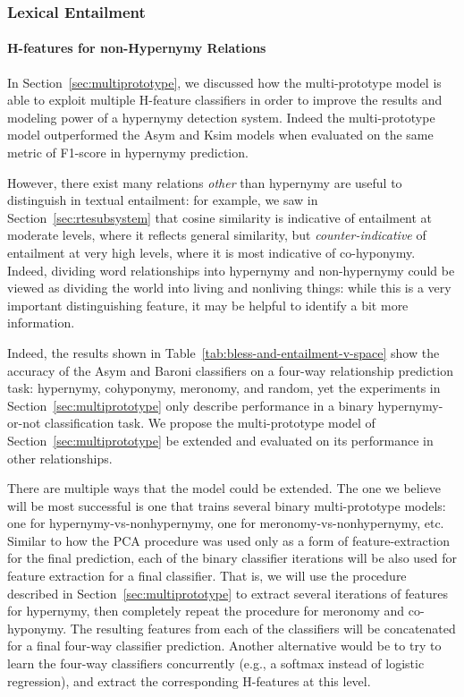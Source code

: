 \documentclass[letterpaper]{article}
\begin{document}
\subsubsection{Lexical Entailment}

\paragraph{H-features for non-Hypernymy Relations}

In Section~\ref{sec:multiprototype}, we discussed how the multi-prototype model
is able to exploit multiple H-feature classifiers in order to improve the results
and modeling power of a hypernymy detection system. Indeed the multi-prototype
model outperformed the Asym and Ksim models when evaluated on the same metric of
F1-score in hypernymy prediction.

However, there exist many relations {\em other} than hypernymy are useful to
distinguish in textual entailment: for example, we saw in
Section~\ref{sec:rtesubsystem} that cosine similarity is indicative of entailment
at moderate levels, where it reflects general similarity, but {\em counter-indicative}
of entailment at very high levels, where it is most indicative of co-hyponymy.
Indeed, dividing word relationships into hypernymy and non-hypernymy could be
viewed as dividing the world into living and nonliving things: while this is
a very important distinguishing feature, it may be helpful to identify a bit more
information.

Indeed, the results shown in Table~\ref{tab:bless-and-entailment-v-space} show
the accuracy of the Asym and Baroni classifiers on a four-way relationship
prediction task: hypernymy, cohyponymy, meronomy, and random, yet the
experiments in Section~\ref{sec:multiprototype} only describe performance in a
binary hypernymy-or-not classification task. We propose the multi-prototype
model of Section~\ref{sec:multiprototype} be extended and evaluated on its
performance in other relationships.

There are multiple ways that the model could be extended. The one we believe
will be most successful is one that trains several binary multi-prototype models:
one for hypernymy-vs-nonhypernymy, one for meronomy-vs-nonhypernymy, etc.
Similar to how the PCA procedure was used only as a form of feature-extraction
for the final prediction, each of the binary classifier iterations will be also
used for feature extraction for a final classifier.
That is, we will use the procedure described in Section~\ref{sec:multiprototype}
to extract several iterations of features for hypernymy, then completely repeat
the procedure for meronomy and co-hyponymy. The resulting features from each
of the classifiers will be concatenated for a final four-way classifier prediction.
Another alternative would be to try to learn the four-way classifiers concurrently
(e.g., a softmax instead of logistic regression), and extract the corresponding
H-features at this level.
\end{document}
